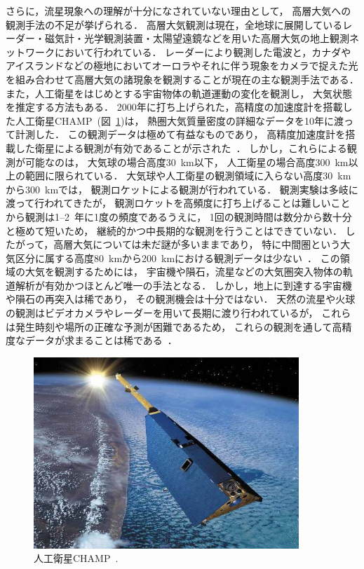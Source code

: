 さらに，流星現象への理解が十分になされていない理由として，
高層大気への観測手法の不足が挙げられる．
高層大気観測は現在，全地球に展開しているレーダー・磁気計・光学観測装置・太陽望遠鏡などを用いた高層大気の地上観測ネットワークにおいて行われている．
レーダーにより観測した電波と，カナダやアイスランドなどの極地においてオーロラやそれに伴う現象をカメラで捉えた光を組み合わせて高層大気の諸現象を観測することが現在の主な観測手法である．
また，人工衛星をはじめとする宇宙物体の軌道運動の変化を観測し，
大気状態を推定する方法もある．
2000年に打ち上げられた，高精度の加速度計を搭載した人工衛星CHAMP~\cite{stolle2006magnetic}(図~\ref{fig:champ})は，
熱圏大気質量密度の詳細なデータを10年に渡って計測した．
この観測データは極めて有益なものであり，
高精度加速度計を搭載した衛星による観測が有効であることが示された~\cite{fujiwara2013uchu}．
しかし，これらによる観測が可能なのは，
大気球の場合高度30~km以下，
人工衛星の場合高度300~km以上の範囲に限られている．
大気球や人工衛星の観測領域に入らない高度30~kmから300~kmでは，
観測ロケットによる観測が行われている．
観測実験は多岐に渡って行われてきたが，
観測ロケットを高頻度に打ち上げることは難しいことから観測は1--2~年に1度の頻度であるうえに，
1回の観測時間は数分から数十分と極めて短いため，
継続的かつ中長期的な観測を行うことはできていない．
したがって，高層大気については未だ謎が多いままであり，
特に中間圏という大気区分に属する高度80~kmから200~kmにおける観測データは少ない~\cite{sato2017frequency}．
この領域の大気を観測するためには，
宇宙機や隕石，流星などの大気圏突入物体の軌道解析が有効かつほとんど唯一の手法となる．
しかし，地上に到達する宇宙機や隕石の再突入は稀であり，
その観測機会は十分ではない．
天然の流星や火球の観測はビデオカメラやレーダーを用いて長期に渡り行われているが，
これらは発生時刻や場所の正確な予測が困難であるため，
これらの観測を通して高精度なデータが求まることは稀である~\cite{kimura2018master}．

\begin{figure}[H]
    \centering
    \includegraphics[width=10cm]{fig/intro/CHAMP.png}
    \caption{人工衛星CHAMP~\cite{zehentner2017phd}.}
    \label{fig:champ}
\end{figure}

